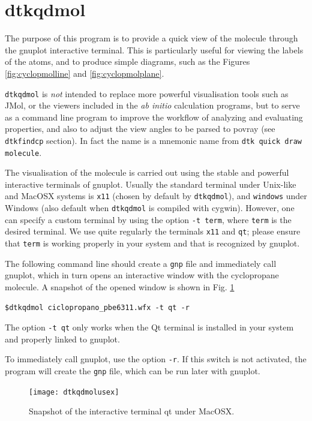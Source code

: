 \section{\label{sec:dtkqdmol}dtkqdmol}

The purpose of this program is to provide a quick view of the molecule through the gnuplot interactive terminal. This is particularly useful for viewing the labels of the atoms, and to produce simple diagrams, such as the Figures \ref{fig:cyclopmolline} and \ref{fig:cyclopmolplane}.

\texttt{dtkqdmol} is \textit{not} intended to replace more powerful visualisation tools such as JMol, or the viewers included in the \textit{ab initio} calculation programs, but to serve as a command line program to improve the workflow of analyzing and evaluating properties, and also to adjust the view angles to be parsed to povray (see \texttt{dtkfindcp} section). In fact the name is a mnemonic name from \texttt{dtk quick draw molecule}.

The visualisation of the molecule is carried out using the stable and powerful interactive terminals of gnuplot. Usually the standard terminal under Unix-like and MacOSX systems is \texttt{x11} (chosen by default by \texttt{dtkqdmol}), and \texttt{windows} under Windows (also default when \texttt{dtkqdmol} is compiled with cygwin). However, one can specify a custom terminal by using the option \texttt{-t term}, where \texttt{term} is the desired terminal. We use quite regularly the terminals \texttt{x11} and \texttt{qt}; please ensure that \texttt{term} is working properly in your system and that is recognized by gnuplot.

The following command line should create a \texttt{gnp} file and immediately call gnuplot, which in turn opens an interactive window with the cyclopropane molecule. A snapshot of the opened window is shown in Fig. \ref{fig:dtkqdmolusex}\\
\begin{lstlisting}
$dtkqdmol ciclopropano_pbe6311.wfx -t qt -r
\end{lstlisting}
The option \texttt{-t qt} only works when the Qt terminal is installed in your system and properly linked to gnuplot.

To immediately call gnuplot, use the option \texttt{-r}. If this switch is not activated, the program will create the \texttt{gnp} file, which can be run later with gnuplot.
%
\begin{figure}[hb!]
\centering
\texttt{[image: dtkqdmolusex]}
\caption{Snapshot of the interactive terminal qt under MacOSX.}\label{fig:dtkqdmolusex}
\end{figure}
%

